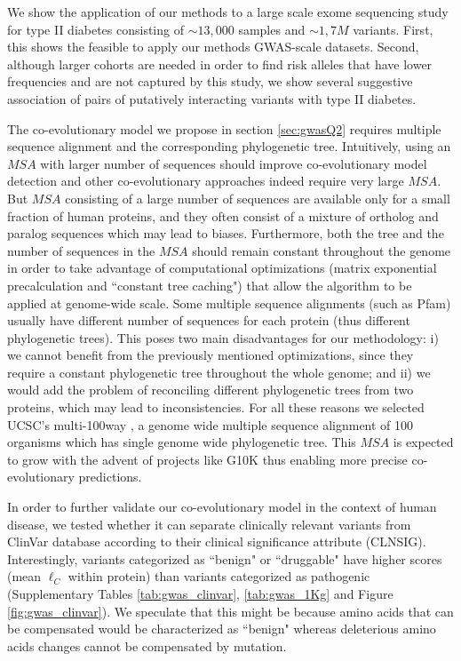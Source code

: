 We show the application of our methods to a large scale exome sequencing study for type II diabetes consisting of $\sim 13,000$ samples and $\sim 1,7M$ variants. First, this shows the feasible to apply our methods GWAS-scale datasets. 
Second, although larger cohorts are needed in order to find risk alleles that have lower frequencies and are not captured by this study, we show several suggestive association of pairs of putatively interacting variants with type II diabetes. 

The co-evolutionary model we propose in section \ref{sec:gwasQ2} requires multiple sequence alignment and the corresponding phylogenetic tree.
Intuitively, using an $MSA$ with larger number of sequences should improve co-evolutionary model detection and other co-evolutionary approaches indeed require very large $MSA$. 
But $MSA$ consisting of a large number of sequences are available only for a small fraction of human proteins, and they often consist of a mixture of ortholog and paralog sequences which may lead to biases. 
Furthermore, both the tree and the number of sequences in the $MSA$ should remain constant throughout the genome in order to take advantage of computational optimizations (matrix exponential precalculation and ``constant tree caching") that allow the algorithm to be applied at genome-wide scale. Some multiple sequence alignments (such as Pfam) usually have different number of sequences for each protein (thus different phylogenetic trees). This poses two main disadvantages for our methodology: i) we cannot benefit from the previously mentioned optimizations, since they require a constant phylogenetic tree throughout the whole genome; and ii) we would add the problem of reconciling different phylogenetic trees from two proteins, which may lead to inconsistencies. 
For all these reasons we selected UCSC's multi-100way \cite{karolchik2014ucsc}, a genome wide multiple sequence alignment of 100 organisms which has single genome wide phylogenetic tree. This $MSA$ is expected to grow with the advent of projects like G10K \cite{haussler2009genome} thus enabling more precise co-evolutionary predictions. 

In order to further validate our co-evolutionary model in the context of human disease, we tested whether it can separate clinically relevant variants from ClinVar database \cite{landrum2013clinvar} according to their clinical significance attribute (CLNSIG). Interestingly, variants categorized as ``benign" or ``druggable" have higher scores (mean $\ell_C$ within protein) than variants categorized as pathogenic (Supplementary Tables \ref{tab:gwas_clinvar}, \ref{tab:gwas_1Kg} and Figure \ref{fig:gwas_clinvar}). We speculate that this might be because amino acids that can be compensated would be characterized as ``benign" whereas deleterious amino acids changes cannot be compensated by mutation. 

